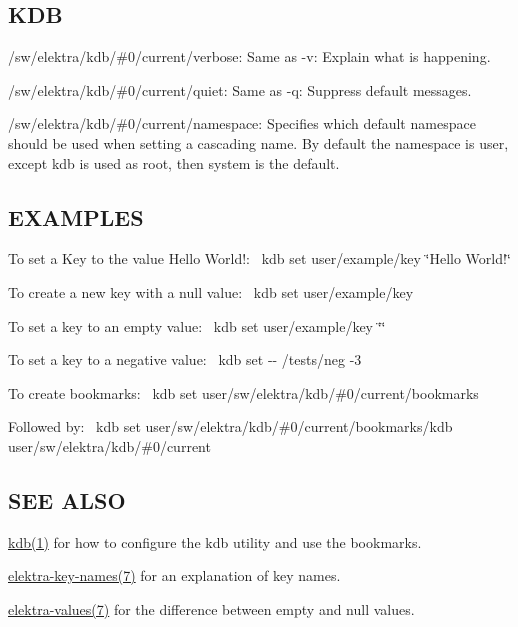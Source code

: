 \subsection*{K\+DB}


\begin{DoxyItemize}
\item {\ttfamily /sw/elektra/kdb/\#0/current/verbose}\+: Same as {\ttfamily -\/v}\+: Explain what is happening.
\item {\ttfamily /sw/elektra/kdb/\#0/current/quiet}\+: Same as {\ttfamily -\/q}\+: Suppress default messages.
\item {\ttfamily /sw/elektra/kdb/\#0/current/namespace}\+: Specifies which default namespace should be used when setting a cascading name. By default the namespace is user, except {\ttfamily kdb} is used as root, then {\ttfamily system} is the default.
\end{DoxyItemize}

\subsection*{E\+X\+A\+M\+P\+L\+ES}

To set a Key to the value {\ttfamily Hello World!}\+:~\newline
 {\ttfamily kdb set user/example/key \char`\"{}\+Hello World!\char`\"{}}

To create a new key with a null value\+:~\newline
 {\ttfamily kdb set user/example/key}

To set a key to an empty value\+:~\newline
 {\ttfamily kdb set user/example/key \char`\"{}\char`\"{}}

To set a key to a negative value\+:~\newline
 {\ttfamily kdb set -\/-\/ /tests/neg -\/3}

To create bookmarks\+:~\newline
 {\ttfamily kdb set user/sw/elektra/kdb/\#0/current/bookmarks}

Followed by\+:~\newline
 {\ttfamily kdb set user/sw/elektra/kdb/\#0/current/bookmarks/kdb user/sw/elektra/kdb/\#0/current}

\subsection*{S\+EE A\+L\+SO}


\begin{DoxyItemize}
\item \hyperlink{md_doc_help_kdb_doc_help_kdb_md}{kdb(1)} for how to configure the kdb utility and use the bookmarks.
\item \hyperlink{md_doc_help_elektra-key-names_doc_help_elektra-key-names_md}{elektra-\/key-\/names(7)} for an explanation of key names.
\item \hyperlink{md_doc_help_elektra-values_doc_help_elektra-values_md}{elektra-\/values(7)} for the difference between empty and null values. 
\end{DoxyItemize}